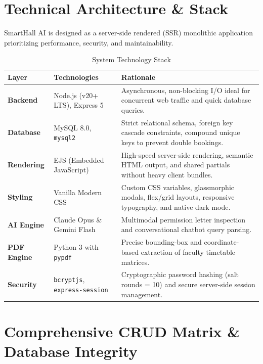 \documentclass[11pt,a4paper]{article}
\begin{document}
\section{Technical Architecture \& Stack}

SmartHall AI is designed as a server-side rendered (SSR) monolithic application prioritizing performance, security, and maintainability.

\begin{table}[H]
    \centering
    \caption{System Technology Stack}
    \begin{tabular}{lp{5cm}p{7cm}}
        \toprule
        \textbf{Layer} & \textbf{Technologies} & \textbf{Rationale} \\
        \midrule
        \textbf{Backend} & Node.js (v20+ LTS), Express 5 & Asynchronous, non-blocking I/O ideal for concurrent web traffic and quick database queries. \\
        \textbf{Database} & MySQL 8.0, \texttt{mysql2} & Strict relational schema, foreign key cascade constraints, compound unique keys to prevent double bookings. \\
        \textbf{Rendering} & EJS (Embedded JavaScript) & High-speed server-side rendering, semantic HTML output, and shared partials without heavy client bundles. \\
        \textbf{Styling} & Vanilla Modern CSS & Custom CSS variables, glassmorphic modals, flex/grid layouts, responsive typography, and native dark mode. \\
        \textbf{AI Engine} & Claude Opus \& Gemini Flash & Multimodal permission letter inspection and conversational chatbot query parsing. \\
        \textbf{PDF Engine} & Python 3 with \texttt{pypdf} & Precise bounding-box and coordinate-based extraction of faculty timetable matrices. \\
        \textbf{Security} & \texttt{bcryptjs}, \texttt{express-session} & Cryptographic password hashing (salt rounds = 10) and secure server-side session management. \\
        \bottomrule
    \end{tabular}
\end{table}

\section{Comprehensive CRUD Matrix \& Database Integrity}
\end{document}

